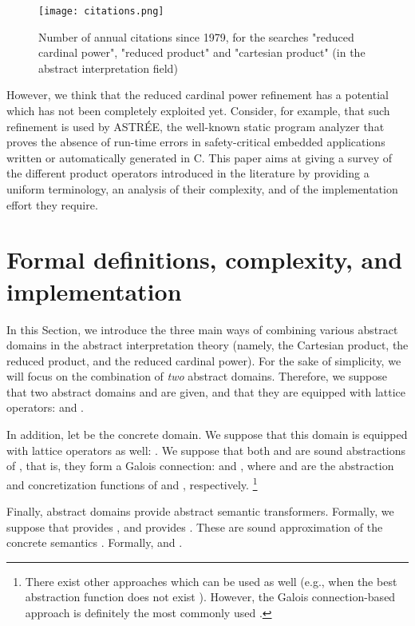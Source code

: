 \documentclass[submission,copyright,creativecommons]{eptcs}
\begin{document}
\begin{center}
\begin{figure}
\texttt{[image: citations.png]}
\label{fig:citations}
\caption{Number of annual citations since 1979, for the searches "reduced cardinal power", "reduced product" and "cartesian product" (in the abstract interpretation field)}
\end{figure}
\end{center}

However, we think that the reduced cardinal power refinement has a potential which has not been completely exploited yet. Consider, for example, that such refinement is used by ASTR\'EE\cite{CCFMMMR05}, the well-known static program analyzer that proves the absence of run-time errors in safety-critical embedded applications written or automatically generated in C. This paper aims at giving a survey of the different product operators introduced in the literature by providing a uniform terminology, an analysis of their complexity, and of the implementation effort they require.


\section{Formal definitions, complexity, and implementation}
\label{sect:formaldef}
In this Section, we introduce the three main ways of combining various abstract domains in the abstract interpretation theory (namely, the Cartesian product, the reduced product, and the reduced cardinal power). For the sake of simplicity, we will focus on the combination of \emph{two} abstract domains. Therefore, we suppose that two abstract domains  and  are given, and that they are equipped with lattice operators:  and .

In addition, let  be the concrete domain. We suppose that this domain is equipped with lattice operators as well: . We suppose that both  and  are sound abstractions of , that is, they form a Galois connection:  and , where  and  are the abstraction and concretization functions of  and , respectively. \footnote{There exist other approaches which can be used as well (e.g., when the best abstraction function does not exist \cite{CH78}). However, the Galois connection-based approach is definitely the most commonly used \cite{CC92a}.}

Finally, abstract domains provide abstract semantic transformers. Formally, we suppose that  provides , and  provides . These are sound approximation of the concrete semantics . Formally,  and .
\end{document}
